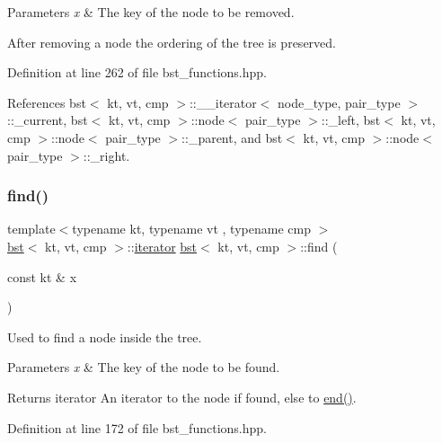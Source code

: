 \begin{DoxyParams}{Parameters}
{\em x} & The key of the node to be removed.\\
\hline
\end{DoxyParams}
After removing a node the ordering of the tree is preserved. 

Definition at line 262 of file bst\+\_\+functions.\+hpp.



References bst$<$ kt, vt, cmp $>$\+::\+\_\+\+\_\+iterator$<$ node\+\_\+type, pair\+\_\+type $>$\+::\+\_\+current, bst$<$ kt, vt, cmp $>$\+::node$<$ pair\+\_\+type $>$\+::\+\_\+left, bst$<$ kt, vt, cmp $>$\+::node$<$ pair\+\_\+type $>$\+::\+\_\+parent, and bst$<$ kt, vt, cmp $>$\+::node$<$ pair\+\_\+type $>$\+::\+\_\+right.

\mbox{\label{classbst_a6c2bdb4e40b2a6871840af57f42765f8}} 
\subsubsection{\texorpdfstring{find()}{find()}\hspace{0.1cm}{\footnotesize\ttfamily [1/2]}}
{\footnotesize\ttfamily template$<$typename kt, typename vt , typename cmp $>$ \\
\hyperlink{classbst}{bst}$<$ kt, vt, cmp $>$\+::\hyperlink{classbst_a429b0445783ff6486882db5dee900ce0}{iterator} \hyperlink{classbst}{bst}$<$ kt, vt, cmp $>$\+::find (\begin{DoxyParamCaption}\item[{const kt \&}]{x }\end{DoxyParamCaption})\hspace{0.3cm}{\ttfamily [noexcept]}}



Used to find a node inside the tree. 


\begin{DoxyParams}{Parameters}
{\em x} & The key of the node to be found. \\
\hline
\end{DoxyParams}
\begin{DoxyReturn}{Returns}
iterator An iterator to the node if found, else to \hyperlink{classbst_aed3a831efc810b5084cb0c9f4adeb16a}{end()}. 
\end{DoxyReturn}


Definition at line 172 of file bst\+\_\+functions.\+hpp.




